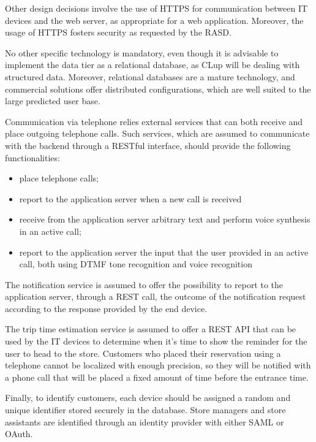 \documentclass[../../main.tex]{subfiles}
\begin{document}
Other design decisions involve the use of HTTPS for communication between IT devices and the web server, as appropriate for a web application. 
Moreover, the usage of HTTPS fosters security as requested by the RASD.

No other specific technology is mandatory, even though it is advisable to implement the data tier as a relational database, 
as CLup will be dealing with structured data. Moreover, relational databases are a mature technology, and commercial solutions offer distributed configurations, 
which are well suited to the large predicted user base.

Communication via telephone relies external services that can both receive and place outgoing telephone calls. Such services, which are assumed to communicate with the backend through a RESTful interface, should provide the following functionalities:
\begin{itemize}
    \item place telephone calls;
    \item report to the application server when a new call is received
    \item receive from the application server arbitrary text and perform voice synthesis in an active call;
    \item report to the application server the input that the user provided in an active call, both using DTMF tone recognition and voice recognition
\end{itemize}

The notification service is assumed to offer the possibility to report to the application server, through a REST call, the outcome of the notification request according to the response provided by the end device.

The trip time estimation service is assumed to offer a REST API that can be used by the IT devices to determine when it's time to show the reminder for the user to head to the store. Customers who placed their reservation using a telephone cannot be localized with enough precision, so they will be notified with a phone call that will be placed a fixed amount of time before the entrance time.

Finally, to identify customers, each device should be assigned a random and unique identifier stored securely in the database. Store managers and store assistants are identified through
an identity provider with either SAML or OAuth. 
\end{document}

